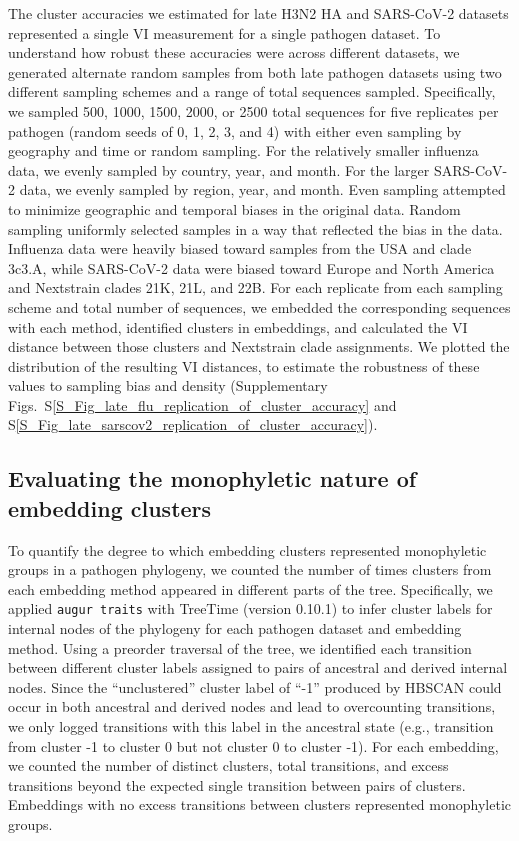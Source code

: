 \documentclass[webpdf,contemporary,large,single]{oup-authoring-template}%
\theoremstyle{thmstyleone}%
\theoremstyle{thmstyletwo}%
\theoremstyle{thmstylethree}%
\begin{document}
The cluster accuracies we estimated for late H3N2 HA and SARS-CoV-2 datasets represented a single VI measurement for a single pathogen dataset.
To understand how robust these accuracies were across different datasets, we generated alternate random samples from both late pathogen datasets using two different sampling schemes and a range of total sequences sampled.
Specifically, we sampled 500, 1000, 1500, 2000, or 2500 total sequences for five replicates per pathogen (random seeds of 0, 1, 2, 3, and 4) with either even sampling by geography and time or random sampling.
For the relatively smaller influenza data, we evenly sampled by country, year, and month.
For the larger SARS-CoV-2 data, we evenly sampled by region, year, and month.
Even sampling attempted to minimize geographic and temporal biases in the original data.
Random sampling uniformly selected samples in a way that reflected the bias in the data.
Influenza data were heavily biased toward samples from the USA and clade 3c3.A, while SARS-CoV-2 data were biased toward Europe and North America and Nextstrain clades 21K, 21L, and 22B.
For each replicate from each sampling scheme and total number of sequences, we embedded the corresponding sequences with each method, identified clusters in embeddings, and calculated the VI distance between those clusters and Nextstrain clade assignments.
We plotted the distribution of the resulting VI distances, to estimate the robustness of these values to sampling bias and density (Supplementary Figs.~S\ref{S_Fig_late_flu_replication_of_cluster_accuracy} and S\ref{S_Fig_late_sarscov2_replication_of_cluster_accuracy}).

\subsection{Evaluating the monophyletic nature of embedding clusters}

To quantify the degree to which embedding clusters represented monophyletic groups in a pathogen phylogeny, we counted the number of times clusters from each embedding method appeared in different parts of the tree.
Specifically, we applied \texttt{augur traits} with TreeTime (version 0.10.1) \citep{Sagulenko2018,Huddleston2021} to infer cluster labels for internal nodes of the phylogeny for each pathogen dataset and embedding method.
Using a preorder traversal of the tree, we identified each transition between different cluster labels assigned to pairs of ancestral and derived internal nodes.
Since the ``unclustered'' cluster label of ``-1'' produced by HBSCAN could occur in both ancestral and derived nodes and lead to overcounting transitions, we only logged transitions with this label in the ancestral state (e.g., transition from cluster -1 to cluster 0 but not cluster 0 to cluster -1).
For each embedding, we counted the number of distinct clusters, total transitions, and excess transitions beyond the expected single transition between pairs of clusters.
Embeddings with no excess transitions between clusters represented monophyletic groups.
\end{document}
